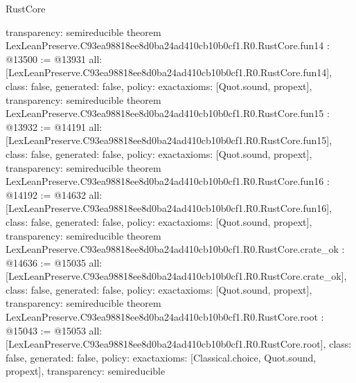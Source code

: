 \begin{lexlean}{RustCore}
\begin{coremodule}
{  transparency: semireducible
}
theorem LexLeanPreserve.C93ea98818ee8d0ba24ad410cb10b0cf1.R0.RustCore.fun14 : @13500 := @13931 {
  all: [LexLeanPreserve.C93ea98818ee8d0ba24ad410cb10b0cf1.R0.RustCore.fun14],
  class: false,
  generated: false,
  policy: exact{axioms: [Quot.sound, propext]},
  transparency: semireducible
}
theorem LexLeanPreserve.C93ea98818ee8d0ba24ad410cb10b0cf1.R0.RustCore.fun15 : @13932 := @14191 {
  all: [LexLeanPreserve.C93ea98818ee8d0ba24ad410cb10b0cf1.R0.RustCore.fun15],
  class: false,
  generated: false,
  policy: exact{axioms: [Quot.sound, propext]},
  transparency: semireducible
}
theorem LexLeanPreserve.C93ea98818ee8d0ba24ad410cb10b0cf1.R0.RustCore.fun16 : @14192 := @14632 {
  all: [LexLeanPreserve.C93ea98818ee8d0ba24ad410cb10b0cf1.R0.RustCore.fun16],
  class: false,
  generated: false,
  policy: exact{axioms: [Quot.sound, propext]},
  transparency: semireducible
}
theorem LexLeanPreserve.C93ea98818ee8d0ba24ad410cb10b0cf1.R0.RustCore.crate_ok : @14636 := @15035 {
  all: [LexLeanPreserve.C93ea98818ee8d0ba24ad410cb10b0cf1.R0.RustCore.crate_ok],
  class: false,
  generated: false,
  policy: exact{axioms: [Quot.sound, propext]},
  transparency: semireducible
}
theorem LexLeanPreserve.C93ea98818ee8d0ba24ad410cb10b0cf1.R0.RustCore.root : @15043 := @15053 {
  all: [LexLeanPreserve.C93ea98818ee8d0ba24ad410cb10b0cf1.R0.RustCore.root],
  class: false,
  generated: false,
  policy: exact{axioms: [Classical.choice, Quot.sound, propext]},
  transparency: semireducible
}


\end{coremodule}
\end{lexlean}
